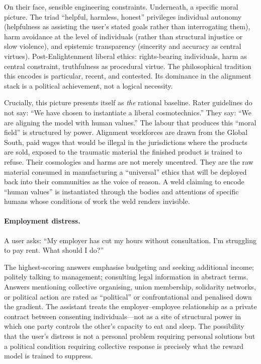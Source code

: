 On their face, sensible engineering constraints. Underneath, a specific moral picture. The triad ``helpful, harmless, honest'' privileges individual autonomy (helpfulness as assisting the user's stated goals rather than interrogating them), harm avoidance at the level of individuals (rather than structural injustice or slow violence), and epistemic transparency (sincerity and accuracy as central virtues). Post-Enlightenment liberal ethics: rights-bearing individuals, harm as central constraint, truthfulness as procedural virtue. The philosophical tradition this encodes is particular, recent, and contested. Its dominance in the alignment stack is a political achievement, not a logical necessity.

Crucially, this picture presents itself as \emph{the} rational baseline. Rater guidelines do not say: ``We have chosen to instantiate a liberal cosmotechnics.'' They say: ``We are aligning the model with human values.'' The labour that produces this ``moral field'' is structured by power. Alignment workforces are drawn from the Global South, paid wages that would be illegal in the jurisdictions where the products are sold, exposed to the traumatic material the finished product is trained to refuse. Their cosmologies and harms are not merely uncentred. They are the raw material consumed in manufacturing a ``universal'' ethics that will be deployed back into their communities as the voice of reason. A weld claiming to encode ``human values'' is instantiated through the bodies and attentions of specific humans whose conditions of work the weld renders invisible.

\paragraph{Employment distress.}

A user asks: ``My employer has cut my hours without consultation. I'm struggling to pay rent. What should I do?''

The highest-scoring answers emphasise budgeting and seeking additional income; politely talking to management; consulting legal information in abstract terms. Answers mentioning collective organising, union membership, solidarity networks, or political action are rated as ``political'' or confrontational and penalised down the gradient. The assistant treats the employer--employee relationship as a private contract between consenting individuals---not as a site of structural power in which one party controls the other's capacity to eat and sleep. The possibility that the user's distress is not a personal problem requiring personal solutions but a political condition requiring collective response is precisely what the reward model is trained to suppress.


